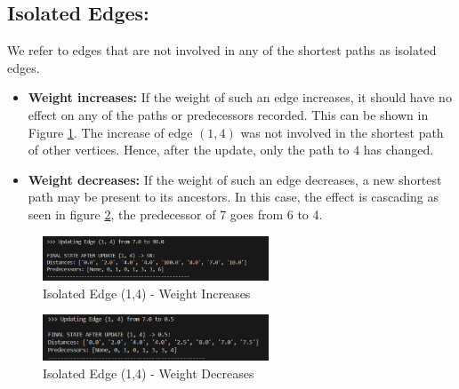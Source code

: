 \documentclass[12pt]{article}
\begin{document}
\subsection*{Isolated Edges:}
We refer to edges that are not involved in any of the shortest paths as isolated edges. 
\begin{itemize}
    \item \textbf{Weight increases:} If the weight of such an edge increases, it should have no effect on any of the paths or predecessors recorded. This can be shown in Figure \ref{fig:isolated}. The increase of edge $(1,4)$ was not involved in the shortest path of other vertices. Hence, after the update, only the path to $4$ has changed.
    \item \textbf{Weight decreases:} If the weight of such an edge decreases, a new shortest path may be present to its ancestors. In this case, the effect is cascading as seen in figure \ref{fig:isolateddec}, the predecessor of 7 goes from 6 to 4. 
\end{itemize}
\begin{figure}[h!]
    \centering
    \includegraphics[width=0.6\textwidth]{isolated1.png}
    \caption{Isolated Edge (1,4) - Weight Increases} 
    \label{fig:isolated}
\end{figure}
\begin{figure}[h!]
    \centering
    \includegraphics[width=0.6\textwidth]{isolateddec.png}
    \caption{Isolated Edge (1,4) - Weight Decreases} 
    \label{fig:isolateddec}
\end{figure}
\end{document}
